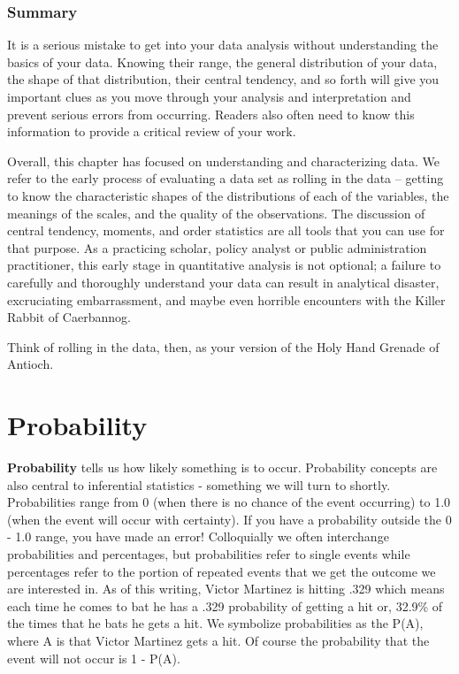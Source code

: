 \documentclass[11pt,openany]{book}\usepackage[]{graphicx}\usepackage[]{color}
\begin{document}
{\subsection{Summary}
 
It is a serious mistake to get into your data analysis without understanding the basics of your data.  Knowing their range, the general distribution of your data, the shape of that distribution, their central tendency, and so forth will give you important clues as you move through your analysis and interpretation and prevent serious errors from occurring.  Readers also often need to know this information to provide a critical review of your work. 
 
Overall, this chapter has focused on understanding and characterizing data. We refer to the early process of evaluating a data set as rolling in the data -- getting to know the characteristic shapes of the distributions of each of the variables, the meanings of the scales, and the quality of the observations.  The discussion of central tendency, moments, and order statistics are all tools that you can use for that purpose. As a practicing scholar, policy analyst or public administration practitioner, this early stage in quantitative analysis is not optional; a failure to carefully and thoroughly understand your data can result in analytical disaster, excruciating embarrassment, and maybe even horrible encounters with the Killer Rabbit of Caerbannog. 
 
Think of rolling in the data, then, as your version of the Holy Hand Grenade of Antioch.




\chapter{Probability}

\textbf{Probability} tells us how likely something is to occur.  Probability concepts are also central to inferential statistics - something we will turn to shortly. Probabilities range from 0 (when there is no chance of the event occurring) to 1.0 (when the event will occur with certainty).  If you have a probability outside the 0 - 1.0 range, you have made an error!  Colloquially we often interchange probabilities and percentages, but probabilities refer to single events while percentages refer to the portion of repeated events that we get the outcome we are interested in.  As of this writing, Victor Martinez is hitting .329 which means each time he comes to bat he has a .329 probability of getting a hit or, 32.9\% of the times that he bats he gets a hit.  We symbolize probabilities as the P(A), where A is that Victor Martinez gets a hit.   Of course the probability that the event will not occur is 1 - P(A).

}
\end{document}
